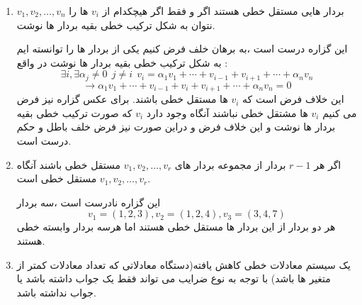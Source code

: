 \documentclass{article}
\begin{document}
\begin{enumerate}
  \item 
  $v_1,v_2,\ldots,v_n$
  بردار هایی مستقل خطی هستند اگر و فقط اگر هیچکدام از 
  $v_i$
  ها را نتوان به شکل ترکیب خطی بقیه بردار ها نوشت.
 \begin{حل}
 	این گزاره درست است  ،به برهان خلف فرض کنیم یکی از بردار ها را توانسته ایم به شکل ترکیب خطی بقیه بردار ها نوشت در واقع :
 	$$\exists i,\exists \alpha_j\neq0\ \ j\neq i \ \ v_i=\alpha_1v_1+\cdots+v_{i-1}+v_{i+1}+\cdots+\alpha_nv_n$$
 	$$\longrightarrow \alpha_1v_1+\cdots+v_{i-1}+v_i+v_{i+1}+\cdots+\alpha_nv_n=0$$
 	این خلاف فرض است که 
 	$v_i$
 	ها مستقل خطی باشند.
 	برای عکس گزاره نیز فرض می کنیم 
 	$v_i$
 ها مشتقل خطی نباشند آنگاه وجود دارد
 	$v_i$
 	که صورت ترکیب خطی بقیه بردار ها نوشت و این خلاف فرض و دراین صورت نیز فرض خلف باطل و حکم درست است.
 \end{حل}
  \item 
  اگر هر 
  $r-1$
  بردار از مجموعه بردار های 
  $v_1,v_2,\ldots,v_r$
  مستقل خطی باشند آنگاه 
   $v_1,v_2,\ldots,v_r$
   مستقل خطی است.
   \begin{حل}
   		این گزاره نادرست است ،سه بردار 
   	$$v_1=(1,2,3),v_2=(1,2,4),v_3=(3,4,7)$$
   	هر دو بردار از این بردار ها مستقل خطی هستند اما هرسه بردار وابسته خطی هستند.
   	\end{حل}
   \item 
   یک سیستم معادلات خطی کاهش یافته(دستگاه معادلاتی که تعداد معادلات کمتر از متغیر ها باشد) با توجه به نوع ضرایب می تواند  فقط یک جواب داشته باشد یا جواب نداشته باشد.
   \begin{حل}

\end{حل}
\end{enumerate}
\end{document}
